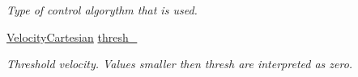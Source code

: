 \begin{DoxyCompactItemize}
\begin{DoxyCompactList}\small\item\em Type of control algorythm that is used. \end{DoxyCompactList}\item 
\hyperlink{classController_a7ab3d947ee649f6bac652de6a00e8148}{Velocity\+Cartesian} \hyperlink{classController_ab6b198e73b4cd806e0bf5c7b724c35bc}{thresh\+\_\+}\hypertarget{classController_ab6b198e73b4cd806e0bf5c7b724c35bc}{}\label{classController_ab6b198e73b4cd806e0bf5c7b724c35bc}

\begin{DoxyCompactList}\small\item\em Threshold velocity. Values smaller then thresh are interpreted as zero. \end{DoxyCompactList}\end{DoxyCompactItemize}
